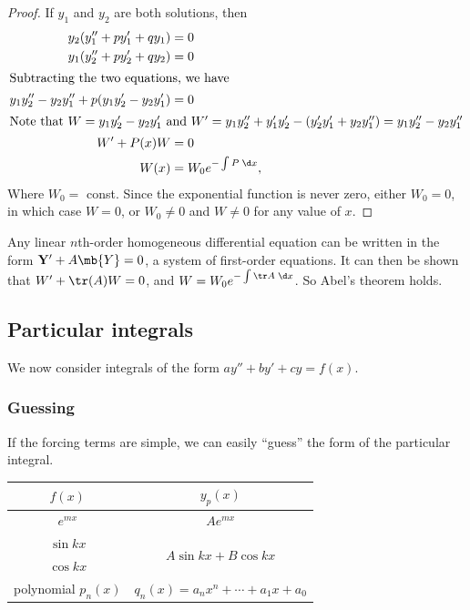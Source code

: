 \documentclass[a4paper]{article}
\begin{document}
  \begin{proof}
    If $y_1$ and $y_2$ are both solutions, then 
    \begin{align*}
      y_2(y_1'' + py_1' + qy_1) &= 0\\
      y_1(y_2'' + py_2' + qy_2) &= 0\\
      \intertext{Subtracting the two equations, we have}
      y_1y_2'' - y_2y_1'' + p(y_1y_2' - y_2y_1') &= 0\\
      \intertext{Note that $W =y_1y_2' - y_2y_1'$ and $W' = y_1y_2'' + y_1'y_2' - (y_2'y_1' + y_2y_1'') = y_1y_2'' - y_2y_1''$}
      W' + P(x)W &= 0\\
      W(x) &= W_0 e^{-\int P\; \d x},
    \end{align*}
    Where $W_0 = $ const. Since the exponential function is never zero, either $W_0 = 0$, in which case $W = 0$, or $W_0 \not= 0$ and $W \not= 0$ for any value of $x$.
  \end{proof}
  \note Any linear $n$th-order homogeneous differential equation can be written in the form $\mathbf{Y}' + A\mb{Y} = 0$, a system of first-order equations. It can then be shown that $W' + \tr(A)W = 0$, and $W = W_0e^{-\int \tr A\;\d x}$. So Abel's theorem holds.

  \subsection{Particular integrals}
  We now consider integrals of the form $ay'' + by' + cy = f(x)$.

  \subsubsection{Guessing}
  If the forcing terms are simple, we can easily ``guess'' the form of the particular integral.

  \vspace{4pt}
  \noindent
  \begin{tabular}{cc}
    \toprule
    $f(x)$ & $y_p(x)$\\
    \midrule
    $e^{mx}$ & $Ae^{mx}$\\
    $\sin kx$ & \multirow{2}{*}{$A\sin kx + B\cos kx$}\\
    $\cos kx$ & \\
    polynomial $p_n(x)$ & $q_n(x) = a_nx^n + \cdots + a_1x + a_0$\\
    \bottomrule
  \end{tabular}
  \vspace{4pt}
\end{document}

